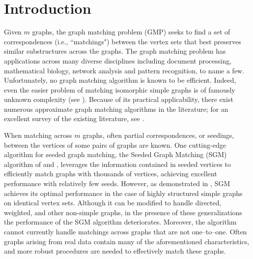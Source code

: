 \documentclass[12pt]{article}
\numberwithin{equation}{section}
\theoremstyle{definition}
\begin{document}
\maketitle
\section{Introduction}

Given $m$ graphs, the graph matching problem (GMP) seeks to find a set of correspondences (i.e., ``matchings")  between the vertex sets that best preserves similar substructures across the graphs.
The graph matching problem has applications across many diverse disciplines including document processing, mathematical biology, network analysis and pattern recognition, to name a few.  Unfortunately, no graph matching algorithm is known to be efficient.  Indeed, even the easier problem of matching isomorphic simple graphs is of famously unknown complexity (see \cite{gandj}).
Because of its practical applicability, there exist numerous approximate graph matching algorithms in the literature; for an excellent survey of the existing literature, see \cite{30ygm}.


When matching across $m$ graphs, often partial correspondences, or
seedings, between the vertices of some pairs of graphs are known. One
cutting-edge algorithm for seeded graph matching, the Seeded Graph
Matching (SGM) algorithm of \cite{FAP} and \cite{sgm2}, leverages the
information contained in seeded vertices to efficiently match graphs
with thousands of vertices, achieving excellent performance with
relatively few seeds. However, as demonstrated in \cite{FAP}, SGM
achieves its optimal performance in the case of highly structured simple
graphs on identical vertex sets.  Although it can be modified to handle
directed, weighted, and other non-simple graphs,
in the presence of these generalizations the performance of the SGM
algorithm deteriorates. 
Moreover, the algorithm cannot currently handle matchings across graphs
that are not one--to--one. 
Often graphs arising from real data contain many of the aforementioned
characteristics, and more robust procedures are needed to effectively
match these graphs.
\end{document}
